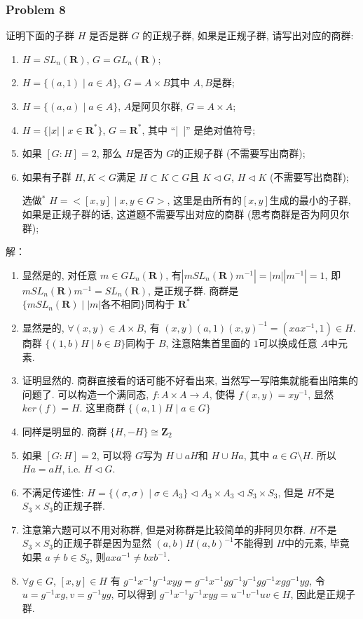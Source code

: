 \documentclass[a4paper,12pt]{ctexart}
\newcommand{\Z}{\mathbf{Z}}
\newcommand{\R}{\mathbf{R}}
\begin{document}
\subsubsection*{Problem 8}
证明下面的子群 $ H $ 是否是群 $ G $ 的正规子群, 如果是正规子群, 请写出对应的商群:
\begin{enumerate}
  \item $ H=SL_n(\R) $, $ G=GL_n(\R) $;
  \item $ H=\{(a,1)\mid a\in A\} $, $ G=A\times B $其中 $ A,B $是群;
  \item $ H=\{(a,a)\mid a\in A\} $, $ A $是阿贝尔群, $ G=A\times A $;
  \item $ H=\{|x|\mid x\in \R^*\} $, $ G=\R^* $, 其中  ``|~|'' 是绝对值符号;
  \item 如果 $ [G:H]=2 $, 那么 $ H $是否为 $ G $的正规子群 (不需要写出商群);
  \item 如果有子群 $ H,K<G $满足 $ H\subset K\subset G $且 $ K\triangleleft G $, $ H\triangleleft K $ (不需要写出商群);
  \item[选做$^*$] $ H=<[x,y]\mid x,y\in G> $, 这里是由所有的$ [x,y] $生成的最小的子群, 如果是正规子群的话, 这道题不需要写出对应的商群 (思考商群是否为阿贝尔群);
\end{enumerate}

解：
    \begin{enumerate}
      \item 显然是的, 对任意 $ m\in GL_n(\R) $, 有$ |mSL_n(\R)m^{-1}|=|m||m^{-1}|=1 $, 即 $ mSL_n(\R)m^{-1}=SL_n(\R) $, 是正规子群. 商群是 $ \{mSL_n(\R)\mid |m|\text{各不相同}\} $同构于 $ \R^* $
      \item 显然是的, $ \forall (x,y)\in A\times B $, 有 $ (x,y)(a,1)(x,y)^{-1}=(xax^{-1},1)\in H $. 商群 $ \{(1,b)H\mid b\in B\} $同构于 $ B $, 注意陪集首里面的 $ 1 $可以换成任意 $ A $中元素.
      \item 证明显然的. 商群直接看的话可能不好看出来, 当然写一写陪集就能看出陪集的问题了. 可以构造一个满同态, $ f:A\times A\rightarrow A $, 使得 $ f(x,y)=xy^{-1} $, 显然 $ ker(f)=H $. 这里商群 $ \{(a,1)H\mid a\in G\} $
      \item 同样是明显的. 商群 $ \{H,-H\}\cong\Z_2 $
      \item 如果 $ \left[G:H\right]=2 $, 可以将 $ G $写为 $ H\cup aH $和 $ H\cup Ha $, 其中 $ a\in G\setminus H $. 所以 $ Ha=aH $, i.e. $ H\triangleleft G $.
      \item 不满足传递性: $ H=\{(\sigma,\sigma)\mid \sigma\in A_3\}\triangleleft A_3\times A_3\triangleleft S_3\times S_3 $, 但是 $ H $不是 $ S_3\times S_3 $的正规子群.
      \item 注意第六题可以不用对称群, 但是对称群是比较简单的非阿贝尔群. $ H $不是 $ S_3\times S_3 $的正规子群是因为显然 $ (a,b)H(a,b)^{-1} $不能得到 $ H $中的元素, 毕竟如果 $ a\neq b\in S_3 $, 则$ axa^{-1}\neq bxb^{-1} $.
      \item $ \forall g\in G $, $ \left[x,y\right]\in H $ 有 $ g^{-1}x^{-1}y^{-1}xyg=g^{-1}x^{-1}gg^{-1}y^{-1}gg^{-1}xgg^{-1}yg $, 令 $ u=g^{-1}xg,v= g^{-1}yg $, 可以得到 $ g^{-1}x^{-1}y^{-1}xyg=u^{-1}v^{-1}uv\in H  $, 因此是正规子群.
    \end{enumerate}
\end{document}
